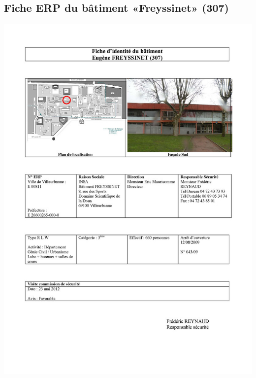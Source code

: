 \documentclass[hidelinks, paper=a4, fontsize=13pt]{report}
\begin{document}
\subsection{Fiche ERP du bâtiment «Freyssinet» (307)}
\begin{center}
\includegraphics[scale=0.5]{Annexes/Documents/ERPFreyssinet}
\end{center}
\end{document}
